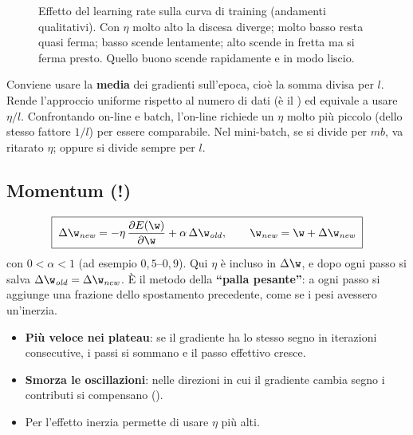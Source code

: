 \begin{figure}[ht]
\centering
{}
\caption{Effetto del learning rate sulla curva di training (andamenti qualitativi). Con $\eta$ molto alto la
discesa diverge; molto basso resta quasi ferma; basso scende lentamente; alto scende in fretta ma si ferma presto.
Quello buono scende rapidamente e in modo liscio.}
\label{fig:eta-curve}
\end{figure}

\begin{idea}
Conviene usare la \textbf{media} dei gradienti sull'epoca, cioè la somma divisa per $l$. Rende l'approccio
uniforme rispetto al numero di dati (è il ) ed equivale a usare $\eta/l$. Confrontando
on-line e batch, l'on-line richiede un $\eta$ molto più piccolo (dello stesso fattore $1/l$) per essere
comparabile. Nel mini-batch, se si divide per $mb$, va ritarato $\eta$; oppure si divide sempre per $l$.
\end{idea}

\subsection{Momentum (!)}

\begin{equation}\label{eq:momentum}
\boxed{\;\Delta\w_{\mathit{new}} = -\eta\,\frac{\partial E(\w)}{\partial\w} + \alpha\,\Delta\w_{\mathit{old}},\qquad \w_{\mathit{new}} = \w + \Delta\w_{\mathit{new}}\;}
\end{equation}
con $0<\alpha<1$ (ad esempio $0{,}5$--$0{,}9$). Qui $\eta$ è incluso in $\Delta\w$, e dopo ogni passo si salva
$\Delta\w_{\mathit{old}} = \Delta\w_{\mathit{new}}$. È il metodo della \textbf{``palla pesante''}: a ogni passo si
aggiunge una frazione dello spostamento precedente, come se i pesi avessero un'inerzia.
\begin{itemize}
  \item \textbf{Più veloce nei plateau}: se il gradiente ha lo stesso segno in iterazioni consecutive, i passi si
        sommano e il passo effettivo cresce.
  \item \textbf{Smorza le oscillazioni}: nelle direzioni in cui il gradiente cambia segno i contributi si
        compensano ().
  \item Per l'effetto inerzia permette di usare $\eta$ più alti.
\end{itemize}

